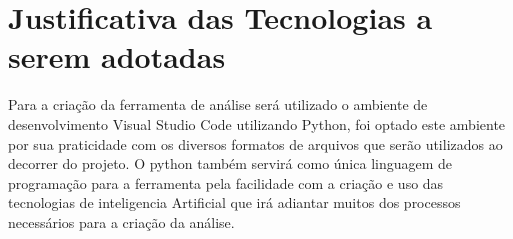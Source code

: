 \section{Justificativa das Tecnologias a serem adotadas}

Para a criação da ferramenta de análise será utilizado o ambiente de desenvolvimento Visual Studio Code utilizando Python, foi optado este ambiente por sua praticidade com os diversos formatos de arquivos que serão utilizados ao decorrer do projeto. 
O python também servirá como única linguagem de programação para a ferramenta pela facilidade com a criação e uso das tecnologias de inteligencia Artificial que irá adiantar muitos dos processos necessários para a criação da análise.